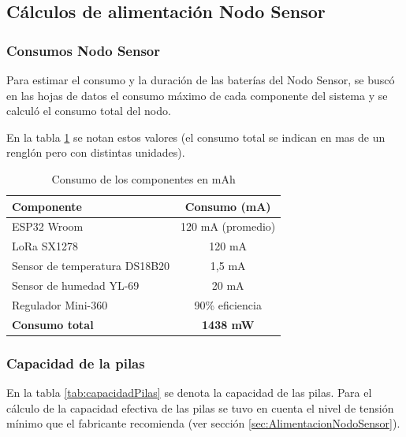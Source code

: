 \subsection{Cálculos de alimentación Nodo Sensor}
\subsubsection{Consumos Nodo Sensor}
Para estimar el consumo y la duración de las baterías del Nodo Sensor, se buscó en las hojas de datos el consumo máximo de cada componente del sistema y se calculó el consumo total del nodo. 

En la tabla \ref{tab:consumosNodo} se notan estos valores (el consumo total se indican en mas de un renglón pero con distintas unidades).


\begin{table}[h]
    \centering

    \begin{tabular}{@{}lc@{}}
        \toprule
        \textbf{Componente}            & \textbf{Consumo (mA)} \\ \midrule
        ESP32 Wroom                   & 120 mA (promedio)      \\ 
        LoRa SX1278                   & 120 mA                  \\ 
        Sensor de temperatura DS18B20  & 1,5 mA     \\ 
        Sensor de humedad YL-69        & 20 mA                  \\ 
        Regulador Mini-360             & 90\% eficiencia                  \\ \midrule
        \textbf{Consumo total}        & \textbf{1438 mW}     \\ \bottomrule
    \end{tabular}
    \caption{Consumo de los componentes en mAh}
    \label{tab:consumosNodo}
\end{table}

\subsubsection{Capacidad de la pilas}
En la tabla \ref{tab:capacidadPilas} se denota la capacidad de las pilas. Para el cálculo de la capacidad efectiva de las pilas se tuvo en cuenta el nivel de tensión mínimo que el fabricante recomienda (ver sección \ref{sec:AlimentacionNodoSensor}). 

